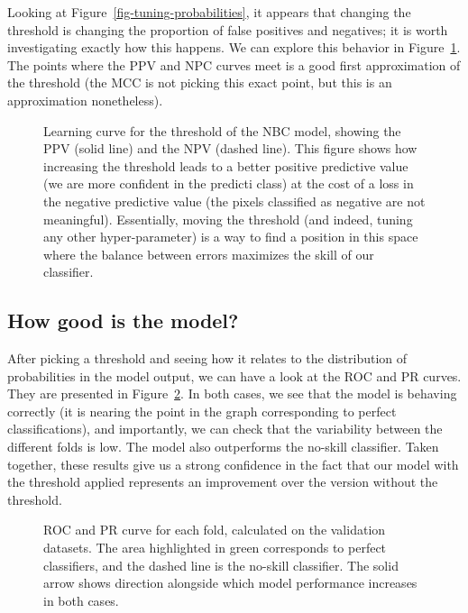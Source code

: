 \documentclass[
  letterpaper,
]{scrbook}
\begin{document}
Looking at Figure~\ref{fig-tuning-probabilities}, it appears that
changing the threshold is changing the proportion of false positives and
negatives; it is worth investigating exactly how this happens. We can
explore this behavior in Figure~\ref{fig-tuning-ppvnpv}. The points
where the PPV and NPC curves meet is a good first approximation of the
threshold (the MCC is not picking this exact point, but this is an
approximation nonetheless).

\begin{figure}[pbt]


\caption{\label{fig-tuning-ppvnpv}Learning curve for the threshold of
the NBC model, showing the PPV (solid line) and the NPV (dashed line).
This figure shows how increasing the threshold leads to a better
positive predictive value (we are more confident in the predicti class)
at the cost of a loss in the negative predictive value (the pixels
classified as negative are not meaningful). Essentially, moving the
threshold (and indeed, tuning any other hyper-parameter) is a way to
find a position in this space where the balance between errors maximizes
the skill of our classifier.}

\end{figure}%

\subsection{How good is the model?}\label{how-good-is-the-model}

After picking a threshold and seeing how it relates to the distribution
of probabilities in the model output, we can have a look at the ROC and
PR curves. They are presented in Figure~\ref{fig-tuning-roc-pr}. In both
cases, we see that the model is behaving correctly (it is nearing the
point in the graph corresponding to perfect classifications), and
importantly, we can check that the variability between the different
folds is low. The model also outperforms the no-skill classifier. Taken
together, these results give us a strong confidence in the fact that our
model with the threshold applied represents an improvement over the
version without the threshold.

\begin{figure}[pbt]


\caption{\label{fig-tuning-roc-pr}ROC and PR curve for each fold,
calculated on the validation datasets. The area highlighted in green
corresponds to perfect classifiers, and the dashed line is the no-skill
classifier. The solid arrow shows direction alongside which model
performance increases in both cases.}

\end{figure}%
\end{document}
